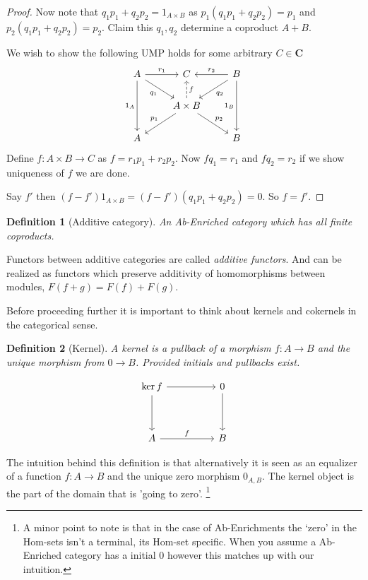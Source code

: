 \documentclass[12pt]{article}
\numberwithin{equation}{section}
\newtheorem{definition}{Definition}[section]
\begin{document}
\begin{appendices}
\begin{proof}
		Now note that $q_1p_1+q_2p_2=1_{A\times B}$ as $p_1(q_1p_1+q_2p_2)=p_1$ and $p_2(q_1p_1+q_2p_2)=p_2$. Claim this $q_1,q_2$ determine a coproduct $A +B$.
		
		We wish to show the following UMP holds for some arbitrary $C \in \mathbf{C}$
		\[\begin{tikzcd}
			A & C & B \\
			& {A\times B} \\
			A && B
			\arrow["{q_1}"', from=1-1, to=2-2]
			\arrow["{q_2}", from=1-3, to=2-2]
			\arrow["{p_1}"', from=2-2, to=3-1]
			\arrow["{p_2}", from=2-2, to=3-3]
			\arrow["{1_B}"', from=1-3, to=3-3]
			\arrow["{1_A}"', from=1-1, to=3-1]
			\arrow["{r_1}", from=1-1, to=1-2]
			\arrow["{r_2}"', from=1-3, to=1-2]
			\arrow["{f}"',dashed, from=2-2, to=1-2]
		\end{tikzcd}\]
		Define $f: A\times B \to C$ as $f=r_1p_1+r_2p_2$. Now $fq_1=r_1$ and $fq_2=r_2$ if we show uniqueness of $f$ we are done.
		
		Say $f'$ then $(f-f')1_{A \times B}=(f-f')(q_1p_1+q_2p_2)=0$. So $f=f'$.
		
		
	\end{proof}
	
	
	\begin{definition}[Additive category]
		An Ab-Enriched category which has all finite coproducts.
	\end{definition}
	
	Functors between additive categories are called \textit{additive functors}. And can be realized as functors which preserve additivity of homomorphisms between modules, $F(f+g)=F(f)+F(g).$
	
	Before proceeding further it is important to think about kernels and cokernels in the categorical sense.
	\begin{definition}[Kernel]
		A kernel is a pullback of a morphism $f:A \to B$ and the unique morphism from $0 \to B$. Provided initials and pullbacks exist.
		
		\[\begin{tikzcd}
			{\ker f} && 0 \\
			\\
			A && B
			\arrow["f", from=3-1, to=3-3]
			\arrow[from=1-3, to=3-3]
			\arrow[from=1-1, to=1-3]
			\arrow[from=1-1, to=3-1]
		\end{tikzcd}\]
	\end{definition}
	The intuition behind this definition is that alternatively it is seen as an equalizer of a function $f:A \to B$ and the unique zero morphism $0_{A,B}$. The kernel object is the part of the domain that is 'going to zero'. \footnote{A minor point to note is that in the case of Ab-Enrichments the `zero' in the Hom-sets isn't a terminal, its Hom-set specific. When you assume a Ab-Enriched category has a initial 0 however this matches up with our intuition.}
	

\end{appendices}
\end{document}
